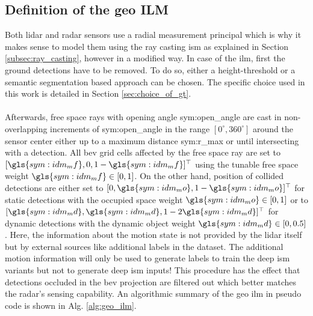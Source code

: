\subsection{Definition of the geo ILM}
\label{subsec:method_geo_ilm}
Both lidar and radar sensors use a radial measurement principal which is why it makes sense to model them using the ray casting \gls{ism} as explained in Section \ref{subsec:ray_casting}, however in a modified way. In case of the \gls{ilm}, first the ground detections have to be removed. To do so, either a height-threshold or a semantic segmentation based approach can be chosen. The specific choice used in this work is detailed in Section \ref{sec:choice_of_gt}.
\\\\
Afterwards, free space rays with opening angle \gls{sym:open_angle} are cast in non-overlapping increments of \gls{sym:open_angle} in the range $[0^\circ, 360^\circ]$ around the sensor center either up to a maximum distance \gls{sym:r_max} or until intersecting with a detection. All \gls{bev} grid cells affected by the free space ray are set to $[\gls{sym:idm_mf},0,1-\gls{sym:idm_mf}]^\top$ using the tunable free space weight $\gls{sym:idm_mf} \in [0,1]$. On the other hand, position of collided detections are either set to $[0,\gls{sym:idm_mo},1-\gls{sym:idm_mo}]^\top$ for static detections with the occupied space weight $\gls{sym:idm_mo} \in [0,1]$ or to $[\gls{sym:idm_md}, \gls{sym:idm_md}, 1-2\gls{sym:idm_md}]^\top$ for dynamic detections with the dynamic object weight $\gls{sym:idm_md} \in [0,0.5]$. Here, the information about the motion state is not provided by the lidar itself but by external sources like additional labels in the dataset. The additional motion information will only be used to generate labels to train the deep \gls{ism} variants but not to generate deep \gls{ism} inputs! This procedure has the effect that detections occluded in the \gls{bev} projection are filtered out which better matches the radar's sensing capability. An algorithmic summary of the geo \gls{ilm} in pseudo code is shown in Alg. \ref{alg:geo_ilm}.
\\\\
